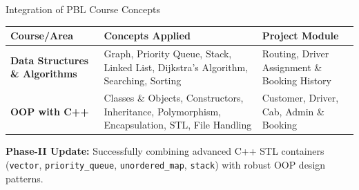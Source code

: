 \documentclass[aspectratio=169,11pt]{beamer}
\begin{document}
\begin{frame}{Integration of PBL Course Concepts}
\tiny
\begin{center}
\renewcommand{\arraystretch}{1.2}
\begin{tabularx}{.96\textwidth}{@{}>{\bfseries}p{3.5cm}X p{2.2cm}@{}}
\toprule
Course/Area & Concepts Applied & Project Module\\
\midrule
Data Structures \& Algorithms & Graph, Priority Queue, Stack, Linked List, Dijkstra's Algorithm, Searching, Sorting & Routing, Driver Assignment \& Booking History\\
OOP with C++ & Classes \& Objects, Constructors, Inheritance, Polymorphism, Encapsulation, STL, File Handling & Customer, Driver, Cab, Admin \& Booking\\
\bottomrule
\end{tabularx}
\end{center}

\vspace{2mm}

\begin{center}
\colorbox{GEULightBlue}{\parbox{.86\textwidth}{\centering
\scriptsize \textbf{Phase-II Update:} Successfully combining advanced C++ STL containers (\texttt{vector}, \texttt{priority\_queue}, \texttt{unordered\_map}, \texttt{stack}) with robust OOP design patterns.}}
\end{center}
\end{frame}
\end{document}
